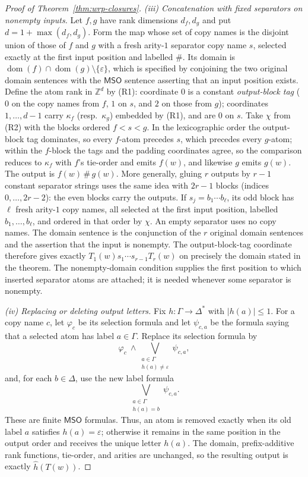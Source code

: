 \documentclass[11pt]{article}
\theoremstyle{definition}
\newcommand{\Z}{\mathbb Z}
\newcommand{\MSO}{\mathsf{MSO}}
\begin{document}
\begin{proof}[Proof of Theorem~\ref{thm:wrp-closures}]
\vspace{0.5em}
\noindent\emph{(iii) Concatenation with fixed separators on nonempty inputs.}
Let $f,g$ have rank dimensions $d_f,d_g$ and put $d=1+\max(d_f,d_g)$.  Form the
map whose set of copy names is the disjoint union of those of $f$ and $g$ with
a fresh arity-$1$ separator copy name $s$, selected exactly at the first input
position and labelled $\#$.  Its domain is
$\operatorname{dom}(f)\cap\operatorname{dom}(g)\setminus\{\varepsilon\}$,
which is specified by conjoining the two original domain sentences with the
$\MSO$ sentence asserting that an input position exists.
Define the atom rank in $\Z^d$ by (R1): coordinate $0$ is a constant
\emph{output-block tag} ($0$ on the copy names from $f$, $1$ on $s$, and $2$
on those from $g$); coordinates
$1,\ldots,d-1$ carry $\kappa_f$ (resp.\ $\kappa_g$) embedded by (R1), and are
$0$ on $s$.  Take $\chi$ from (R2) with the blocks ordered $f<s<g$.  In the
lexicographic order the output-block tag dominates, so every $f$-atom precedes
$s$, which precedes every $g$-atom; within the $f$-block the tags and the
padding coordinates agree, so the comparison reduces to $\kappa_f$ with $f$'s
tie-order and emits $f(w)$, and likewise $g$ emits $g(w)$.  The output is
$f(w)\,\#\,g(w)$.  More generally, gluing $r$ outputs by $r-1$ constant separator
strings uses the same idea with $2r-1$ blocks (indices $0,\ldots,2r-2$): the even
blocks carry the outputs.  If $s_j=b_1\cdots b_\ell$, its odd block has $\ell$
fresh arity-$1$ copy names, all selected at the first input position, labelled
$b_1,\ldots,b_\ell$, and ordered in that order by $\chi$.  An empty separator
uses no copy names.  The domain sentence is the conjunction of the $r$ original
domain sentences and the assertion that the input is nonempty.  The
output-block-tag coordinate therefore gives exactly
$T_1(w)s_1\cdots s_{r-1}T_r(w)$ on precisely the domain stated in the theorem.
The nonempty-domain condition supplies the first position to which inserted
separator atoms are attached; it is needed whenever some separator is
nonempty.

\vspace{0.5em}
\noindent\emph{(iv) Replacing or deleting output letters.}
Fix $h\colon\Gamma\to\Delta^*$ with $|h(a)|\le 1$.  For a copy name $c$, let
$\varphi_c$ be its selection formula and let $\psi_{c,a}$ be the formula saying
that a selected atom has label $a\in\Gamma$.  Replace its selection formula by
\[
   \varphi_c\ \wedge\!
   \bigvee_{\substack{a\in\Gamma\\ h(a)\ne\varepsilon}}\psi_{c,a},
\]
and, for each $b\in\Delta$, use the new label formula
\[
   \bigvee_{\substack{a\in\Gamma\\ h(a)=b}}\psi_{c,a}.
\]
These are finite $\MSO$ formulas.  Thus, an atom is removed exactly when its
old label $a$ satisfies $h(a)=\varepsilon$; otherwise it remains in the same
position in the output order and receives the unique letter $h(a)$.  The
domain, prefix-additive rank functions, tie-order, and arities are unchanged,
so the resulting output
is exactly $\widehat h(T(w))$.


\end{proof}
\end{document}
